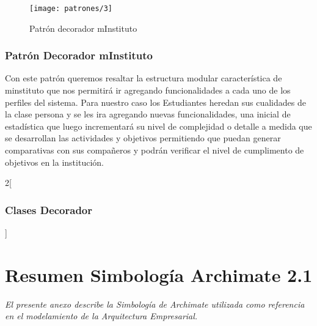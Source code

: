   \begin{figure}[H]
	\centering
	\texttt{[image: patrones/3]}
	\captionsetup{width=.95\textwidth}
	\caption{Patrón decorador mInstituto \cite{ref9,ref6}}
	\label{patron2}
  \end{figure}

  \subsection{Patrón Decorador mInstituto}
  Con este patrón queremos resaltar la estructura modular característica de minstituto que nos permitirá ir agregando funcionalidades a cada uno de los perfiles del sistema. Para nuestro caso los Estudiantes heredan sus cualidades de la clase persona y se les ira agregando nuevas funcionalidades, una inicial de estadística que luego incrementará su nivel de complejidad o detalle a medida que se desarrollan las actividades y objetivos permitiendo que puedan generar comparativas con sus compañeros y podrán verificar el nivel de cumplimento de objetivos en la institución.

\begin{multicols}{2}[\subsection{Clases Decorador}]
	
	
	
	
	
\end{multicols}

\chapter{Resumen Simbología Archimate 2.1}
\label{apex:anexos}
\textit{El presente anexo describe la Simbología de Archimate utilizada como referencia en el modelamiento de la Arquitectura Empresarial.}
\vfill
\minitoc
\newpage

